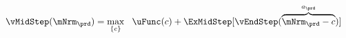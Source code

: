   \begin{equation}\begin{gathered}\begin{aligned}
        \vMidStep(\mNrm_{\prd}) & = \max_{\{{c}\}}~~\uFunc({c}) +\ExMidStep[ \vEndStep(\overbrace{\mNrm_{\prd}-{c}}^{a_{\prd}})] \label{eq:vMidStep}
      \end{aligned}\end{gathered}\end{equation}
